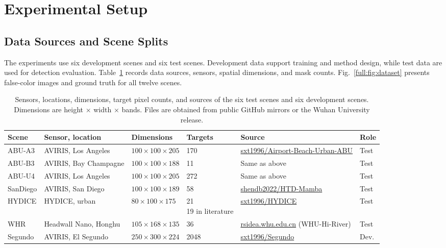 \documentclass[a4paper,11pt]{article}
\begin{document}
\section{Experimental Setup}\label{sec:setup}
\subsection{Data Sources and Scene Splits}
The experiments use six development scenes and six test scenes. Development data support training and method design, while test data are used for detection evaluation. Table~\ref{full:tab:data} records data sources, sensors, spatial dimensions, and mask counts. Fig.~\ref{full:fig:dataset} presents false-color images and ground truth for all twelve scenes.

\begin{table}[H]\centering\scriptsize\setlength{\tabcolsep}{3pt}
\caption{Sensors, locations, dimensions, target pixel counts, and sources of the six test scenes and six development scenes. Dimensions are height $\times$ width $\times$ bands. Files are obtained from public GitHub mirrors or the Wuhan University release.}\label{full:tab:data}
\begin{tabularx}{\linewidth}{l p{2.35cm} l l X l}\toprule
Scene & Sensor, location & Dimensions & Targets & Source & Role \\ \midrule
ABU-A3 & AVIRIS, Los Angeles & $100\times100\times205$ & 170 & \href{https://github.com/sxt1996/Airport-Beach-Urban-ABU}{sxt1996/Airport-Beach-Urban-ABU} & Test \\
ABU-B3 & AVIRIS, Bay Champagne & $100\times100\times188$ & 11 & Same as above & Test \\
ABU-U4 & AVIRIS, Los Angeles & $100\times100\times205$ & 272 & Same as above & Test \\
SanDiego & AVIRIS, San Diego & $100\times100\times189$ & 58 & \href{https://github.com/shendb2022/HTD-Mamba}{shendb2022/HTD-Mamba} & Test \\
HYDICE & HYDICE, urban & $80\times100\times175$ & \shortstack[l]{21\\19 in literature} & \href{https://github.com/sxt1996/HYDICE}{sxt1996/HYDICE} & Test \\
WHR & Headwall Nano, Honghu & $105\times168\times135$ & 36 & \href{http://rsidea.whu.edu.cn}{rsidea.whu.edu.cn} (WHU-Hi-River) & Test \\
\midrule
Segundo & AVIRIS, El Segundo & $250\times300\times224$ & 2048 & \href{https://github.com/sxt1996/Segundo}{sxt1996/Segundo} & Dev. \\

\end{tabularx}
\end{table}
\end{document}
